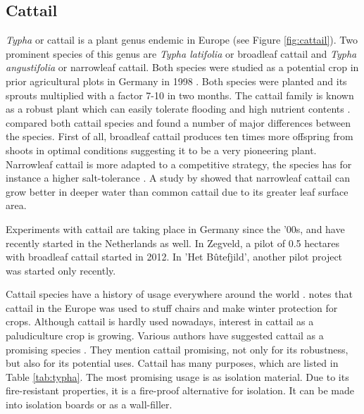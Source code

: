 {\subsection{Cattail}


\textit{Typha} or cattail is a plant genus endemic in Europe (see Figure \ref{fig:cattail}). Two prominent species of this genus are \textit{Typha latifolia} or broadleaf cattail and \textit{Typha angustifolia} or narrowleaf cattail. Both species were studied as a potential crop in prior agricultural plots in Germany in 1998 \citep{wild2001cultivation}. Both species were planted and its sprouts multiplied with a factor 7-10 in two months. The cattail family is known as a robust plant which can easily tolerate flooding and high nutrient contents \citep{wild2001cultivation}. \citet{heinz2011population} compared both cattail species and found a number of major differences between the species. First of all, broadleaf cattail produces ten times more offspring from shoots in optimal conditions suggesting it to be a very pioneering plant. Narrowleaf cattail is more adapted to a competitive strategy, the species has for instance a higher salt-tolerance \citep{heinz2011population}. A study by \citet{grace1982niche} showed that narrowleaf cattail can grow better in deeper water than common cattail due to its greater leaf surface area.

Experiments with cattail are taking place in Germany since the '00s, and have recently started in the Netherlands as well. In Zegveld, a pilot of 0.5 hectares with broadleaf cattail started in 2012. In 'Het B\^utefjild', another pilot project was started only recently. 

Cattail species have a history of usage everywhere around the world \citep{morton1975cattails}. \citet{morton1975cattails} notes that cattail in the Europe was used to stuff chairs and make winter protection for crops. Although cattail is hardly used nowadays, interest in cattail as a paludiculture crop is growing. Various authors have suggested cattail as a promising species \citep{morton1975cattails, heinz2011population}. They mention cattail promising, not only for its robustness, but also for its potential uses. Cattail has many purposes, which are listed in Table \ref{tab:typha}. The most promising usage is as isolation material. Due to its fire-resistant properties, it is a fire-proof alternative for isolation. It can be made into isolation boards or as a wall-filler. 

}
